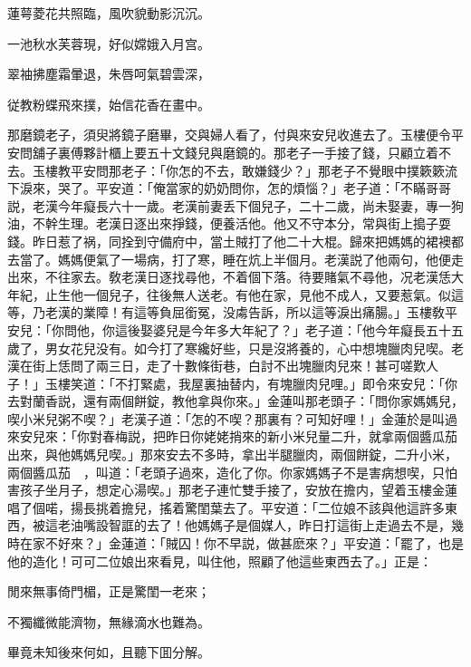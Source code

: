 \begin{myquote}
蓮萼菱花共照臨，風吹貌動影沉沉。

一池秋水芙蓉現，好似嫦娥入月宫。

翠袖拂塵霜暈退，朱唇呵氣碧雲深，

従教粉蝶飛來撲，始信花香在畫中。
\end{myquote}

那磨鏡老子，須臾將鏡子磨畢，交與婦人看了，付與來安兒收進去了。玉樓便令平安問舖子裏傅夥計櫃上要五十文錢兒與磨鏡的。那老子一手接了錢，只顧立着不去。玉樓教平安問那老子：「你怎的不去，敢嫌錢少？」那老子不覺眼中撲簌簌流下淚來，哭了。平安道：「俺當家的奶奶問你，怎的煩惱？」老子道：「不瞞哥哥説，老漢今年癡長六十一歲。老漢前妻丢下個兒子，二十二歲，尚未娶妻，專一狗油，不幹生理。老漢日逐出來掙錢，便養活他。他又不守本分，常與街上搗子耍錢。昨日惹了祸，同拴到守備府中，當土賊打了他二十大棍。歸來把媽媽的裙襖都去當了。媽媽便氣了一場病，打了寒，睡在炕上半個月。老漢説了他兩句，他便走出來，不往家去。敎老漢日逐找尋他，不着個下落。待要賭氣不尋他，况老漢恁大年紀，止生他一個兒子，往後無人送老。有他在家，見他不成人，又要惹氣。似這等，乃老漢的業障！有這等負屈銜冤，没䖏告訴，所以這等淚出痛腸。」玉樓敎平安兒：「你問他，你這後娶婆兒是今年多大年紀了？」老子道：「他今年癡長五十五歲了，男女花兒没有。如今打了寒纔好些，只是沒將養的，心中想塊臘肉兒喫。老漢在街上恁問了兩三日，走了十數條街巷，白討不出塊臘肉兒來！甚可嗟歎人子！」玉樓笑道：「不打緊處，我屋裏抽替内，有塊臘肉兒哩。」即令來安兒：「你去對蘭香説，還有兩個餅錠，教他拿與你來。」金蓮叫那老頭子：「問你家媽媽兒，喫小米兒粥不喫？」老漢子道：「怎的不喫？那裏有？可知好哩！」金蓮於是叫過來安兒來：「你對春梅説，把昨日你姥姥捎來的新小米兒量二升，就拿兩個醬瓜茄出來，與他媽媽兒喫。」那來安去不多時，拿出半腿臘肉，兩個餅錠，二升小米，兩個醬瓜茄　，叫道：「老頭子過來，造化了你。你家媽媽子不是害病想喫，只怕害孩子坐月子，想定心湯喫。」那老子連忙雙手接了，安放在擔内，望着玉樓金蓮唱了個喏，揚長挑着擔兒，搖着驚閨葉去了。平安道：「二位娘不該與他這許多東西，被這老油嘴設智誆的去了！他媽媽子是個媒人，昨日打這街上走過去不是，幾時在家不好來？」金蓮道：「賊囚！你不早説，做甚麽來？」平安道：「罷了，也是他的造化！可可二位娘出來看見，叫住他，照顧了他這些東西去了。」正是：

\begin{myquote}
閒來無事倚門楣，正是驚閨一老來；

不獨纖微能濟物，無緣滴水也難為。
\end{myquote}

畢竟未知後來何如，且聽下囬分解。

